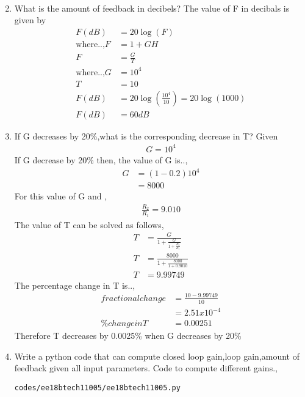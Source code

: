 \begin{enumerate}[label=\thesubsection.\arabic*.,ref=\thesubsection.\theenumi]
\begin{align}
\end{align}
\item What is the amount of feedback in decibels?
\solution The value of F in decibals is given by 
\begin{align}
    F(dB) &= 20\log(F)\\
\text{where..,} F &= 1+GH \\
F &= \frac{G}{T}\\
\text{where..,} G&=10^4 \\ T &= 10\\
F(dB) &= 20\log(\frac{10^4}{10})=20\log(1000)\\
F(dB) &= 60 dB
\end{align}
\item If G decreases by 20\%,what is the corresponding decrease in T?
\solution Given
\begin{align}
G = 10^4
\end{align}
If G decrease by 20\% then,
the value of G is..,
\begin{align}
    G &= (1-0.2)10^4 \\
      &= 8000
\end{align}
For this value of G and ,
\begin{align}
    \frac{R_2}{R_1} = 9.010
\end{align}
The value of T can be solved as follows,
\begin{align}
 T &= \frac{G}{1+\frac{G}{1+\frac{R_2}{R_1}}}\\
 T &= \frac{8000}{1+\frac{8000}{1+0.9010}}\\
 T &= 9.99749
\end{align}
The percentage change in T is..,
\begin{align}
    fractionalchange &= \frac{10-9.99749}{10}\\
      &= 2.51x10^{-4}\\
     \% change in T &= 0.00251
\end{align}
Therefore T decreases by 0.0025\% when G decreases by 20\%
\item Write a python code that can compute closed loop gain,loop gain,amount of feedback given all input parameters.
\solution
Code to compute different gains.,
\begin{lstlisting}
codes/ee18btech11005/ee18btech11005.py
\end{lstlisting}
\end{enumerate}
